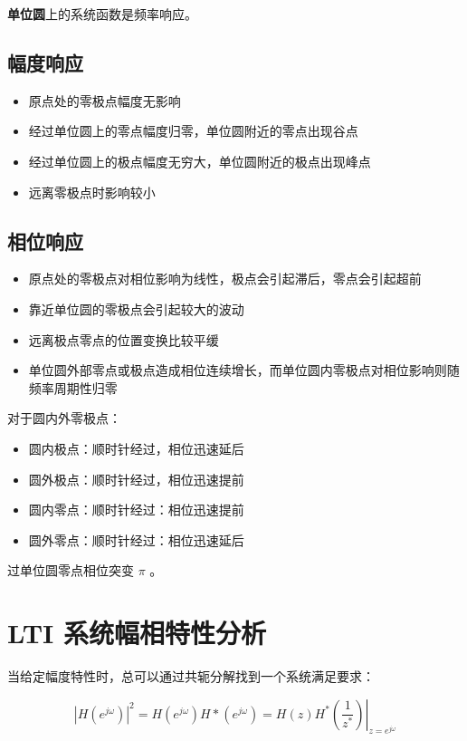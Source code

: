 \documentclass[cn,11pt,chinese,black,simple]{elegantbook}
\begin{document}
\textbf{单位圆}上的系统函数是频率响应。

\subsection{幅度响应}

\begin{itemize}
    \item 原点处的零极点幅度无影响
    \item 经过单位圆上的零点幅度归零，单位圆附近的零点出现谷点
    \item 经过单位圆上的极点幅度无穷大，单位圆附近的极点出现峰点
    \item 远离零极点时影响较小
\end{itemize}

\subsection{相位响应}

\begin{itemize}
    \item 原点处的零极点对相位影响为线性，极点会引起滞后，零点会引起超前
    \item 靠近单位圆的零极点会引起较大的波动
    \item 远离极点零点的位置变换比较平缓
    \item 单位圆外部零点或极点造成相位连续增长，而单位圆内零极点对相位影响则随频率周期性归零
\end{itemize}

对于圆内外零极点：

\begin{itemize}
    \item 圆内极点：顺时针经过，相位迅速延后
    \item 圆外极点：顺时针经过，相位迅速提前
    \item 圆内零点：顺时针经过：相位迅速提前
    \item 圆外零点：顺时针经过：相位迅速延后
\end{itemize}

过单位圆零点相位突变 \(\pi\) 。

\section{LTI 系统幅相特性分析}

当给定幅度特性时，总可以通过共轭分解找到一个系统满足要求：
 

\[
\left|H\left(e^{j \omega}\right)\right|^{2}=H\left(e^{j \omega}\right) H *\left(e^{j \omega}\right)=\left.H(z) H^{*}\left(\dfrac{1}{z^{*}}\right)\right|_{z=e^{j \omega}}
\]
\end{document}
